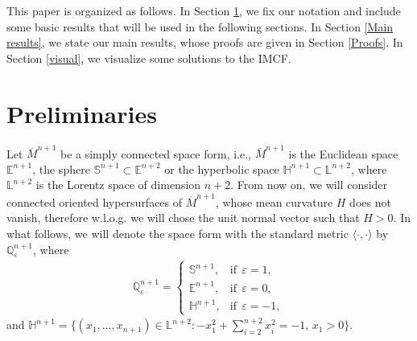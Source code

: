 \documentclass[11pt,a4paper,reqno]{amsproc}
\numberwithin{equation}{section}
\newcommand{\E}{\mathbb{E}}
\begin{document}
 This paper is organized as follows. 
  In Section \ref{preliminaries}, we fix our notation and include some basic results that will be used in the following sections. 
    In Section \ref{Main results}, we state our main results, 
   whose proofs are given in Section \ref{Proofs}.
 In Section \ref{visual}, we visualize some solutions to the IMCF. 

 

\section{Preliminaries}\label{preliminaries}
Let $\overline{M}^{n+1}$ be  a simply connected space form, i.e., $\overline{M}^{n+1}$ is the Euclidean space $\mathbb{E}^{n+1}$, the sphere $\mathbb{S}^{n+1} \subset \E^{n+2}$ or the hyperbolic space $\mathbb{H}^{n+1} \subset \mathbb{L}^{n+2}$, where $\mathbb{L}^{n+2}$ is the Lorentz space of dimension $n+2$. 
From now on, we will consider  connected  oriented hypersurfaces  of  $\overline{M}^{n+1}$, whose mean curvature $H$ does not vanish, therefore w.l.o.g. we will chose the unit normal vector such that  $H>0$.  
In what follows, we will denote 
the space form with the standard metric $\langle \cdot, \cdot\rangle$  by $\mathbb {Q}^{n+1}_{\varepsilon}$, where
\begin{eqnarray}
\mathbb {Q}^{n+1}_{\varepsilon}= \left\{ \begin{array}{ll}
\mathbb {S}^{n+1},	& \mbox{if} ~~ \varepsilon = 1, \nonumber \\ 
\mathbb {E}^{n+1},	& \mbox{if} ~~ \varepsilon = 0, \nonumber \\
\mathbb {H}^{n+1},	& \mbox{if} ~~ \varepsilon = -1, \nonumber
\end{array} 
\right.
\end{eqnarray}
 and $
\mathbb {H}^{n+1}=\{(x_{1},\ldots,x_{n+1}) \in \mathbb {L}^{n+2}:-x_{1}^{2}+   
\sum_{i=2}^{n+2}x_i^2=-1 \mbox{, } x_{1}>0\} 
$. 
\end{document}
